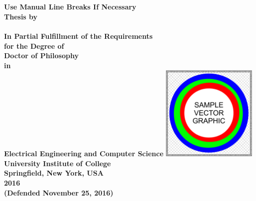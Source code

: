 

\thispagestyle{empty}

\begingroup
\centering
{}
~
\\[1em]
\sffamily\bfseries\fontsize{26}{31.2}\selectfont
\DocumentTitle
\\
Use Manual Line Breaks If Necessary
\\[0.4in]
\normalfont\large
Thesis by
\\[0.25em]
\sffamily\bfseries\Large
\AuthorName
\\[0.4in]
\normalfont\normalsize
In Partial Fulfillment of the Requirements
\\[0.5em]
for the Degree of
\\[0.5em]
Doctor of Philosophy
\\[0.5em]
in
\\[0.5em]
Electrical Engineering and Computer Science
\vfill
\includegraphics[height=1.8in]
{Figures/Figure-SchoolLogo}
\\[1.5em]
University Institute of College
\\[0.5em]
Springfield, New York, USA
\\[1.5em]
2016
\\[0.5em]
(Defended November 25, 2016)
\par
\endgroup

\clearpage
